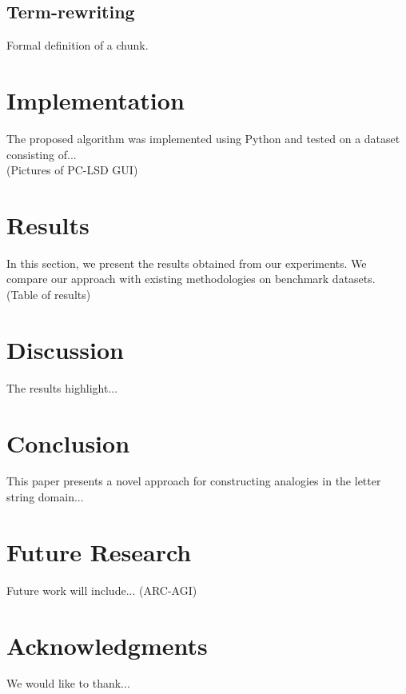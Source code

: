 \documentclass{article}
\begin{document}
\subsection{Term-rewriting}
Formal definition of a chunk.


\section{Implementation}
The proposed algorithm was implemented using Python and tested on a dataset consisting of...
\\
(Pictures of PC-LSD GUI)

\section{Results}
In this section, we present the results obtained from our experiments. We compare our approach with existing methodologies on benchmark datasets.
\\
(Table of results)

\section{Discussion}
The results highlight...

\section{Conclusion}
This paper presents a novel approach for constructing analogies in the letter string domain...\\
\section{Future Research}
Future work will include... (ARC-AGI)

\section*{Acknowledgments}
We would like to thank...
\end{document}

